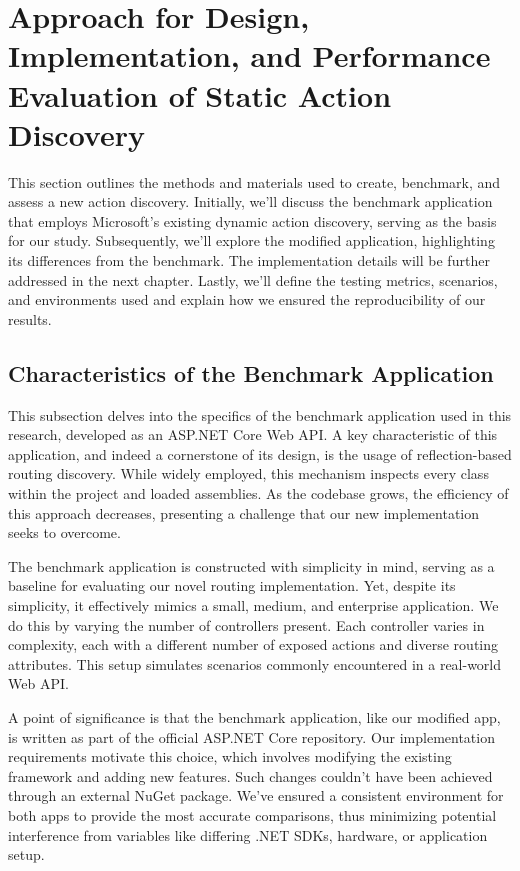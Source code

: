 \chapter{Approach for Design, Implementation, and Performance Evaluation of Static Action Discovery}

This section outlines the methods and materials used to create, benchmark, and assess a new action discovery. Initially, we'll discuss the benchmark application that employs Microsoft's existing dynamic action discovery, serving as the basis for our study. Subsequently, we'll explore the modified application, highlighting its differences from the benchmark. The implementation details will be further addressed in the next chapter. Lastly, we'll define the testing metrics, scenarios, and environments used and explain how we ensured the reproducibility of our results.


\section{Characteristics of the Benchmark Application}

This subsection delves into the specifics of the benchmark application used in this research, developed as an ASP.NET Core Web API. A key characteristic of this application, and indeed a cornerstone of its design, is the usage of reflection-based routing discovery. While widely employed, this mechanism inspects every class within the project and loaded assemblies. As the codebase grows, the efficiency of this approach decreases, presenting a challenge that our new implementation seeks to overcome.

The benchmark application is constructed with simplicity in mind, serving as a baseline for evaluating our novel routing implementation. Yet, despite its simplicity, it effectively mimics a small, medium, and enterprise application. We do this by varying the number of controllers present. Each controller varies in complexity, each with a different number of exposed actions and diverse routing attributes. This setup simulates scenarios commonly encountered in a real-world Web API.

A point of significance is that the benchmark application, like our modified app, is written as part of the official ASP.NET Core repository. Our implementation requirements motivate this choice, which involves modifying the existing framework and adding new features. Such changes couldn't have been achieved through an external NuGet package. We've ensured a consistent environment for both apps to provide the most accurate comparisons, thus minimizing potential interference from variables like differing .NET SDKs, hardware, or application setup.

